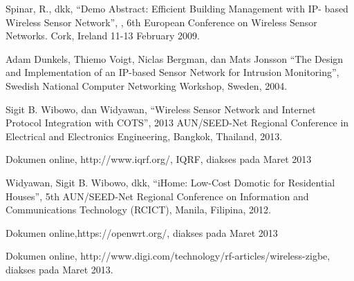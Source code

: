 \documentclass{jtetiproposalskripsi}
\begin{document}

\begin{thebibliography}{9}

Spinar, R., dkk, ``Demo Abstract: Efficient Building Management with IP- based Wireless Sensor Network'', , 6th European Conference on Wireless Sensor Networks. Cork, Ireland 11-13 February 2009.

Adam Dunkels, Thiemo Voigt, Niclas Bergman, dan Mats Jonsson ``The Design and Implementation of an IP-based Sensor Network for Intrusion Monitoring'', Swedish National Computer Networking Workshop, Sweden, 2004.

Sigit B. Wibowo, dan Widyawan, ``Wireless Sensor Network and Internet Protocol Integration with COTS'', 2013 AUN/SEED-Net Regional Conference in Electrical and Electronics Engineering, Bangkok, Thailand, 2013.

Dokumen online, http://www.iqrf.org/, IQRF, diakses pada Maret 2013

Widyawan, Sigit B. Wibowo, dkk, ``iHome: Low-Cost Domotic for Residential Houses'', 5th AUN/SEED-Net Regional Conference on Information and Communications Technology (RCICT), Manila, Filipina, 2012.

Dokumen online,https://openwrt.org/, diakses pada Maret 2013

Dokumen online, http://www.digi.com/technology/rf-articles/wireless-zigbe,
diakses pada Maret 2013.

\end{thebibliography}
\end{document}
